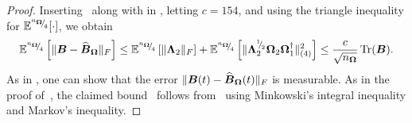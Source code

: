 \begin{proof}
    Inserting~ along with  in , letting $c=154$, and using the triangle inequality for $\mathbb{E}^{{}^{n_{\boldsymbol{\Omega}}}{\mskip -5mu/\mskip -3mu}_{4}}[\cdot]$, we obtain
    \begin{equation}
        \mathbb{E}^{{}^{n_{\boldsymbol{\Omega}}}{\mskip -5mu/\mskip -3mu}_{4}} \left[\lVert \boldsymbol{B} - \widehat{\boldsymbol{B}}_{\boldsymbol{\Omega}} \rVert _F \right]
        \leq \mathbb{E}^{{}^{n_{\boldsymbol{\Omega}}}{\mskip -5mu/\mskip -3mu}_{4}} \left[ \lVert \boldsymbol{\Lambda}_2 \rVert _F \right] + \mathbb{E}^{{}^{n_{\boldsymbol{\Omega}}}{\mskip -5mu/\mskip -3mu}_{4}} \left[ \lVert \boldsymbol{\Lambda}_2^{{}^{1}{\mskip -5mu/\mskip -3mu}_{2}} \boldsymbol{\Omega}_2 \boldsymbol{\Omega}_1^{\dagger} \rVert _{(4)}^2 \right]
        \leq \frac{c}{\sqrt{n_{\boldsymbol{\Omega}}}} \operatorname{Tr}(\boldsymbol{B}).
        \label{equ:frobenius-moment-bound}
    \end{equation}
    As in \cite{kressner-2024-randomized-lowrank}, one can show that the error $\lVert \boldsymbol{B}(t) - \widehat{\boldsymbol{B}}_{\boldsymbol{\Omega}}(t) \rVert _F$ is measurable.
    As in the proof of~, the claimed bound~
    follows from~ using Minkowski's integral inequality and Markov's inequality.
%     
%     
%         

\end{proof}
